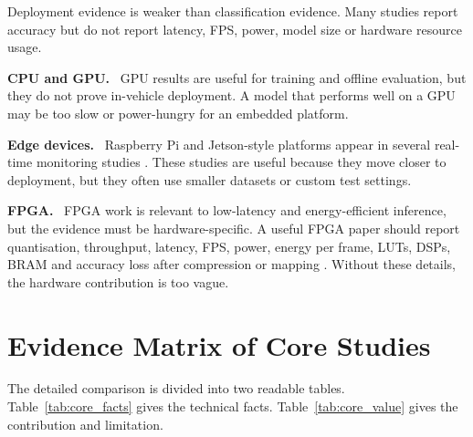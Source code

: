 \documentclass[11pt,a4paper]{article}
\let\oldsection\section
\renewcommand{\section}{\FloatBarrier\Needspace{9\baselineskip}\oldsection}
\newcommand{\focuspara}[1]{\par\medskip\noindent\textbf{#1.}\ }
\begin{document}
Deployment evidence is weaker than classification evidence. Many studies report accuracy but do not report latency, FPS, power, model size or hardware resource usage.

\focuspara{CPU and GPU}
GPU results are useful for training and offline evaluation, but they do not prove in-vehicle deployment. A model that performs well on a GPU may be too slow or power-hungry for an embedded platform.

\focuspara{Edge devices}
Raspberry Pi and Jetson-style platforms appear in several real-time monitoring studies \parencite{kurian2023,mantrala2025,hariharan2023edge}. These studies are useful because they move closer to deployment, but they often use smaller datasets or custom test settings.

\focuspara{FPGA}
FPGA work is relevant to low-latency and energy-efficient inference, but the evidence must be hardware-specific. A useful FPGA paper should report quantisation, throughput, latency, FPS, power, energy per frame, LUTs, DSPs, BRAM and accuracy loss after compression or mapping \parencite{heenetimulla2022}. Without these details, the hardware contribution is too vague.

\clearpage
\section{Evidence Matrix of Core Studies}

The detailed comparison is divided into two readable tables. Table~\ref{tab:core_facts} gives the technical facts. Table~\ref{tab:core_value} gives the contribution and limitation.

\begingroup
\footnotesize
\setlength{\tabcolsep}{2.4pt}
\renewcommand{\arraystretch}{1.18}
\end{document}
